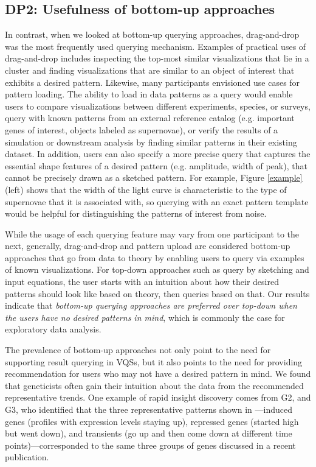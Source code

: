 \subsection{DP2: Usefulness of bottom-up approaches}
\par In contrast, when we looked at bottom-up querying approaches, drag-and-drop was the most frequently used querying mechanism. Examples of practical uses of drag-and-drop includes inspecting the top-most similar visualizations that lie in a cluster and finding visualizations that are similar to an object of interest that exhibits a desired pattern. Likewise, many participants envisioned use cases for pattern loading. The ability to load in data patterns as a query would enable users to compare visualizations between different experiments, species, or surveys, query with known patterns from an external reference catalog (e.g. important genes of interest, objects labeled as supernovae), or verify the results of a simulation or downstream analysis by finding similar patterns in their existing dataset. In addition, users can also specify a more precise query that captures the essential shape features of a desired pattern (e.g. amplitude, width of peak), that  cannot be precisely drawn as a sketched pattern. For example, Figure \ref{example} (left) shows that the width of the light curve is characteristic to the type of supernovae that it is associated with, so querying with an exact pattern template would be helpful for distinguishing the patterns of interest from noise.
\par While the usage of each querying feature may vary from one participant to the next, generally,  drag-and-drop and pattern upload are considered bottom-up approaches that go from data to theory by enabling users to query via examples of known visualizations. For top-down approaches such as query by sketching and input equations, the user starts with an intuition about how their desired patterns should look like based on theory, then queries based on that. Our results indicate that \emph{bottom-up querying approaches are preferred over top-down when the users have no desired patterns in mind}, which is commonly the case for exploratory data analysis.
\par The prevalence of bottom-up approaches not only point to the need for supporting result querying in VQSs, but it also points to the need for providing recommendation for users who may not have a desired pattern in mind. We found that geneticists often gain their intuition about the data from the recommended representative trends. One example of rapid insight discovery comes from G2, and G3, who identified that the three representative patterns shown in \zv---induced genes (profiles with expression levels staying up), repressed genes (started high but went down), and transients (go up and then come down at different time points)---corresponded to the same three groups of genes discussed in a recent publication\cite{Gloss2017}.
